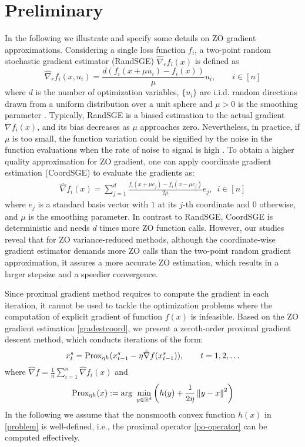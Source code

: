 \section{Preliminary}
In the following we illustrate and specify some details on ZO gradient approximations.
Considering a single loss function $f_i$, a two-point random stochastic gradient estimator (RandSGE) $\hat{\nabla}_r f_i(x)$ is defined as \cite{nesterov2017random,gao2018information}
\begin{equation}\label{gradestrand}
\hat{\nabla}_r f_i(x, u_i) = \frac{d(f_i(x+\mu u_i) - f_i(x))}{\mu}u_i,\qquad i\in [n]
\end{equation}
where $d$ is the number of optimization variables, $\{u_i\}$ are i.i.d. random directions drawn from a uniform distribution over a unit sphere and $\mu > 0$ is the smoothing parameter  \cite{flaxman2005online,shamir2017optimal,gao2018information}. Typically, RandSGE is a biased estimation to the actual gradient $\nabla f_i(x)$, and its bias decreases as $\mu$ approaches zero. Nevertheless, in practice, if $\mu$ is too small, the function variation
could be signified by the noise in the function evaluations when the rate of noise to signal is high  
 \cite{lian2016comprehensive}.
To obtain a higher quality approximation for ZO gradient, one can apply coordinate gradient estimation (CoordSGE) \cite{gu2018inexact,gu2018faster,liu2018zeroth} to evaluate the gradients as:
\begin{align}\label{gradestcoord}
\hat{\nabla} f_i(x) = \sum_{j=1}^d \frac{f_i(x+\mu e_j) - f_i(x-\mu e_j)}{2\mu}e_j,\,\,\,i\in [n]
\end{align}
where  $e_j$ is a standard basis vector with $1$ at its $j$-th coordinate and $0$ otherwise, and $\mu$ is the smoothing parameter. In contrast to RandSGE, CoordSGE is deterministic and needs $d$ times more ZO function calls. 
However, our studies reveal that for ZO variance-reduced
methods, although the coordinate-wise gradient estimator
demands more ZO calls than the two-point random gradient approximation,
it assures a more accurate ZO estimation, which results in a
larger stepsize and a speedier convergence. 

Since proximal gradient method requires to compute the gradient  in each iteration, it cannot be used to tackle the optimization problems where the computation of explicit gradient of function $f(x)$ is infeasible.
Based on the ZO gradient estimation \eqref{gradestcoord}, we present a zeroth-order proximal gradient descent method, which conducts iterations of the form:
\begin{equation}
x_{t}^s= \text{Prox}_{\eta h}(x_{t-1}^s - \eta \hat{\nabla} f(x_{t-1}^s)),\qquad t=1, 2, \ldots
\end{equation}
where $\hat{\nabla} f=\frac{1}{n}\sum_{i=1}^n \hat{\nabla} f_i(x)$ and 
\begin{equation}\label{po-operator}
\text{Prox}_{\eta h}(x) := \text{arg}\,\,\min_{y\in\mathbb{R}^d}\left(h(y)+\frac{1}{2\eta}\left\lVert y-x\right\rVert^2\right)
\end{equation}
In the following we assume that the
nonsmooth convex function $h(x)$ in \eqref{problem} is well-defined, i.e., the proximal operator \eqref{po-operator} can be computed effectively.
\iffalse
